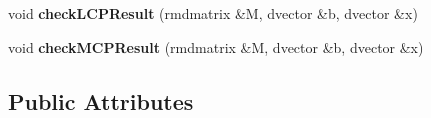 \begin{DoxyCompactItemize}
\item 
\hypertarget{classOpenHRP_1_1CFSImpl_a94ff2216e915e2694b59a248f73ef862}{void {\bfseries check\-L\-C\-P\-Result} (rmdmatrix \&M, dvector \&b, dvector \&x)}\label{classOpenHRP_1_1CFSImpl_a94ff2216e915e2694b59a248f73ef862}

\item 
\hypertarget{classOpenHRP_1_1CFSImpl_ae034f9928a9ca9b4f8dee8d1b3c936ba}{void {\bfseries check\-M\-C\-P\-Result} (rmdmatrix \&M, dvector \&b, dvector \&x)}\label{classOpenHRP_1_1CFSImpl_ae034f9928a9ca9b4f8dee8d1b3c936ba}

\end{DoxyCompactItemize}
\subsection*{Public Attributes}
